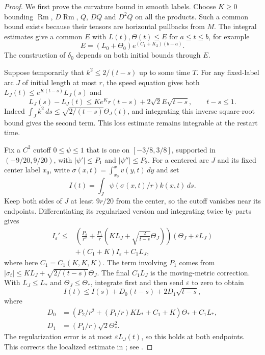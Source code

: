 \begin{proof}
We first prove the curvature bound in smooth labels.  Choose $K\geq0$
bounding $\operatorname{Rm}$, $D\operatorname{Rm}$, $Q$, $DQ$ and $D^2Q$
on all the products.  Such a common bound exists because their tensors are
horizontal pullbacks from $M$.  The integral estimates give a common $E$
with $L(t),\Theta(t)\leq E$ for $a\leq t\leq b$, for example
\[
 E=(L_0+\Theta_0)e^{(C_1+K_2)(b-a)}.
\]
The construction of $\delta_0$ depends on both initial bounds through $E$.

Suppose temporarily that $k^2\leq2/(t-s)$ up to some time $T$.
For any fixed-label arc $J$ of initial length at most $r$, the speed
equation gives both $L_J(t)\leq e^{K(t-s)}L_J(s)$ and
\begin{equation}\label{eq:ramps-arc-loss}
 L_J(s)-L_J(t)
 \leq Ke^Kr(t-s)+2\sqrt2 E\sqrt{t-s},\qquad t-s\leq1.
\end{equation}
Indeed $\int_Jk^2\,ds\leq\sqrt{2/(t-s)}\Theta_J(t)$, and integrating
this inverse square-root bound gives the second term.  This loss estimate
remains integrable at the restart time.

Fix a $C^2$ cutoff $0\leq\psi\leq1$ that is one on $[-3/8,3/8]$,
supported in $(-9/20,9/20)$, with $|\psi'|\leq P_1$ and
$|\psi''|\leq P_2$.  For a centered arc $J$ and its fixed center label $x_0$,
write $\sigma(x,t)=\int_{x_0}^xv(y,t)\,dy$ and set
\[
 I(t)=\int_J\psi(\sigma(x,t)/r)k(x,t)\,ds.
\]
Keep both sides of $J$ at least $9r/20$ from the center, so the cutoff
vanishes near its endpoints.  Differentiating its regularized version and
integrating twice by parts gives
\begin{align*}
 I_\varepsilon'\leq{}&
 \left(\frac{P_2}{r^2}+\frac{P_1}{r}
       \left(KL_J+\sqrt{\frac2{t-s}}\Theta_J\right)\right)
                 (\Theta_J+\varepsilon L_J)\\
 &+(C_1+K)I_\varepsilon+C_1L_J,
\end{align*}
where here $C_1=C_1(K,K,K)$.  The term involving $P_1$ comes from
$|\sigma_t|\leq KL_J+\sqrt{2/(t-s)}\Theta_J$.
The final $C_1L_J$ is the moving-metric correction.  With
$L_J\leq L_*$ and $\Theta_J\leq\Theta_*$, integrate first and then send
$\varepsilon$ to zero to obtain
\begin{equation}\label{eq:ramps-local-turning}
 I(t)\leq I(s)+D_0(t-s)+2D_1\sqrt{t-s},
\end{equation}
where
\begin{align*}
 D_0&=(P_2/r^2+(P_1/r)KL_*+C_1+K)\Theta_*+C_1L_*,\\
 D_1&=(P_1/r)\sqrt2\Theta_*^2.
\end{align*}
The regularization error is at most $\varepsilon L_J(t)$, so this holds
at both endpoints.  This corrects the localized estimate in
\cite[Claim 19.61, pp.~484--485]{MT2007}; see
\cite[p.~9]{MT2015Correction}.


\end{proof}
